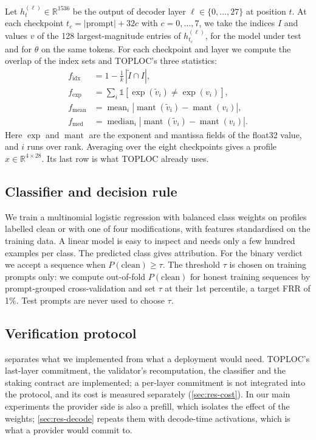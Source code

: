 \documentclass[10pt,twocolumn]{article}
\begin{document}
Let $h^{(\ell)}_t \in \mathbb{R}^{1536}$ be the output of decoder layer $\ell \in \{0,\dots,27\}$ at position $t$.
At each checkpoint $t_c = |\text{prompt}| + 32c$ with $c = 0,\dots,7$, we take the indices $I$ and values $v$ of the 128 largest-magnitude entries of $h^{(\ell)}_{t_c}$, for the model under test and for $\theta$ on the same tokens.
For each checkpoint and layer we compute the overlap of the index sets and TOPLOC's three statistics:
\begin{align*}
  f_{\text{idx}} &= 1 - \tfrac{1}{k}\,|\tilde I \cap I|, \\
  f_{\exp} &= \textstyle\sum_{i} \mathbb{1}[\operatorname{exp}(\tilde v_i) \neq \operatorname{exp}(v_i)], \\
  f_{\text{mean}} &= \operatorname{mean}_i |\operatorname{mant}(\tilde v_i) - \operatorname{mant}(v_i)|, \\
  f_{\text{med}} &= \operatorname{median}_i |\operatorname{mant}(\tilde v_i) - \operatorname{mant}(v_i)|.
\end{align*}
Here $\operatorname{exp}$ and $\operatorname{mant}$ are the exponent and mantissa fields of the float32 value, and $i$ runs over rank.
Averaging over the eight checkpoints gives a profile $x \in \mathbb{R}^{4 \times 28}$.
Its last row is what TOPLOC already uses.

\subsection{Classifier and decision rule}
\label{sec:classifier}

We train a multinomial logistic regression with balanced class weights on profiles labelled clean or with one of four modifications, with features standardised on the training data.
A linear model is easy to inspect and needs only a few hundred examples per class.
The predicted class gives attribution.
For the binary verdict we accept a sequence when $P(\text{clean}) \ge \tau$.
The threshold $\tau$ is chosen on training prompts only: we compute out-of-fold $P(\text{clean})$ for honest training sequences by prompt-grouped cross-validation and set $\tau$ at their 1st percentile, a target FRR of 1\%.
Test prompts are never used to choose $\tau$.

\subsection{Verification protocol}
\label{sec:protocol}

 separates what we implemented from what a deployment would need.
TOPLOC's last-layer commitment, the validator's recomputation, the classifier and the staking contract are implemented; a per-layer commitment is not integrated into the protocol, and its cost is measured separately (\cref{sec:res-cost}).
In our main experiments the provider side is also a prefill, which isolates the effect of the weights; \cref{sec:res-decode} repeats them with decode-time activations, which is what a provider would commit to.
\end{document}
